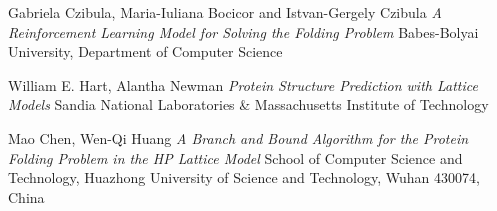 \documentclass[conference]{IEEEtran}
\begin{document}
\begin{thebibliography}{9}

  Gabriela Czibula, Maria-Iuliana Bocicor and Istvan-Gergely Czibula
  \textit{A Reinforcement Learning Model for Solving the Folding Problem}
  Babes-Bolyai University, Department of Computer Science

  William E. Hart, Alantha Newman
  \textit{Protein Structure Prediction with Lattice Models}
  Sandia National Laboratories \& Massachusetts Institute of Technology

  Mao Chen, Wen-Qi Huang
  \textit{A Branch and Bound Algorithm for the Protein Folding Problem in the
HP Lattice Model}
  School of Computer Science and Technology, Huazhong University of Science
and Technology, Wuhan 430074, China

\end{thebibliography}
\end{document}

